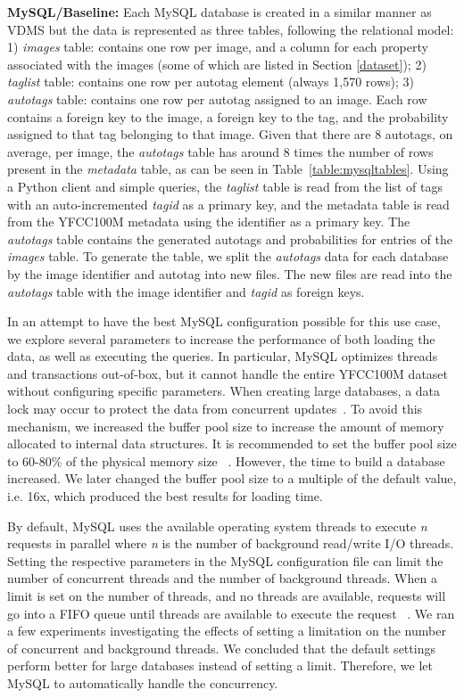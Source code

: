 \textbf{MySQL/Baseline:}
Each MySQL database is created in a similar manner as VDMS 
but the data is represented as three tables, following the relational model:
1) \textit{images} table: contains one row per image,
and a column for each property
associated with the images (some of which are listed in Section \ref{dataset});
2) \textit{taglist} table: contains one row per autotag element
(always 1,570 rows);
3) \textit{autotags} table: contains one row per autotag
assigned to an image. Each row contains a foreign key to the
image, a foreign key to the tag, and
the probability assigned to that tag belonging to that image.
Given that there are 8 autotags, on average, per image, the \textit{autotags}
table has around 8 times the number of rows present in the
\textit{metadata} table, as can be seen in Table~\ref{table:mysqltables}.
Using a Python client and simple queries, the \textit{taglist}
table is read from the list of tags with an auto-incremented
\textit{tagid} as a primary key, and the metadata table
is read from the YFCC100M metadata using the identifier as a primary key.
The \textit{autotags} table contains the generated autotags and
probabilities for entries of the \textit{images} table.
To generate the table, we split the \textit{autotags} data for each database
by the image identifier and autotag into new files.
The new files are read into the \textit{autotags} table with the image
identifier and \textit{tagid} as foreign keys.

In an attempt to have the best MySQL configuration possible for this use case, 
we explore several parameters to increase the performance of both loading the data, 
as well as executing the queries.
In particular, MySQL optimizes threads and transactions out-of-box, 
but it cannot handle the entire YFCC100M dataset without configuring 
specific parameters.
When creating large databases, a data lock may occur to protect the
data from concurrent updates~\cite{mysql_blog}.
To avoid this mechanism, we increased the buffer pool size to
increase the amount of memory allocated to internal data structures.
It is recommended to set the buffer pool size to 60-80\% of the physical
memory size ~\cite{mysql,mysql_blog}.
However, the time to build a database increased. 
We later changed  the buffer pool size to a multiple of the default value, i.e. 16x,
which produced the best results for loading time.

By default, MySQL uses the available operating system threads to  
execute \textit{n} requests in parallel where \textit{n} is 
the number of background read/write I/O threads.
Setting the respective parameters in the MySQL configuration file can limit the
number of concurrent threads and the number of background threads.
When a limit is set on the number of threads, and no threads are available,
requests will go into a FIFO queue until threads are available to execute
the request ~\cite{mysql,mysql_blog}.
We ran a few experiments investigating the effects of setting a limitation on the
number of concurrent and background threads.
We concluded that the default settings perform better for large databases instead of
setting a limit.
Therefore, we let MySQL to automatically handle the concurrency.

